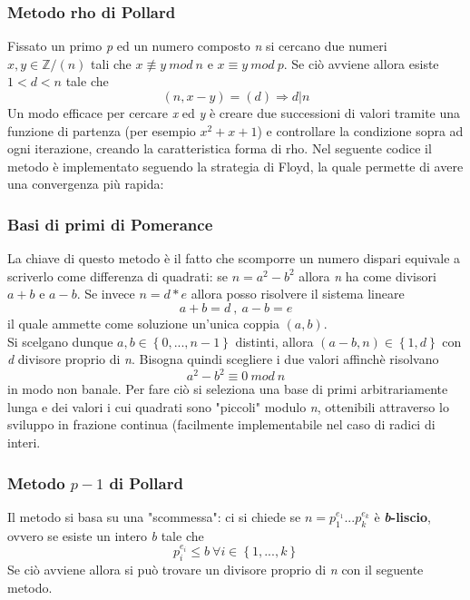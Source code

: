 \documentclass{article}
\begin{document}
	\subsubsection{Metodo rho di Pollard}
	Fissato un primo \textit{p} ed un numero composto \textit{n} si cercano due numeri \(x,y\in\mathbb{Z}/(n)\) tali che \(x\not\equiv y\ mod\ n\) e \(x\equiv y\ mod\ p\). Se ciò avviene allora esiste \(1<d<n\) tale che \[(n,x-y)=(d)\Rightarrow d|n\]
	Un modo efficace per cercare \textit{x} ed \textit{y} è creare due successioni di valori tramite una funzione di partenza (per esempio \(x^2+x+1\)) e controllare la condizione sopra ad ogni iterazione, creando la caratteristica forma di rho. Nel seguente codice il metodo è implementato seguendo la strategia di Floyd, la quale permette di avere una convergenza più rapida: 
	\vspace{1cm}
	
	\vspace{1cm}
	\subsubsection{Basi di primi di Pomerance}
	La chiave di questo metodo è il fatto che scomporre un numero dispari equivale a scriverlo come differenza di quadrati: se \(n=a^2-b^2\) allora \textit{n} ha come divisori \(a+b\) e \(a-b\). Se invece \(n=d*e\) allora posso risolvere il sistema lineare 
	\[a+b=d\ ,\ a-b=e\]
	il quale ammette come soluzione un'unica coppia \((a,b)\).\\ 
	Si scelgano dunque \(a,b\in\left\{0,...,n-1\right\}\) distinti, allora \((a-b,n)\in\left\{1,d\right\}\) con \textit{d} divisore proprio di \textit{n}.
	Bisogna quindi scegliere i due valori affinchè risolvano 
	\[a^2-b^2\equiv 0\ mod\ n \] in modo non banale.
	Per fare ciò si seleziona una base di primi arbitrariamente lunga e dei valori i cui quadrati sono "piccoli" modulo \textit{n}, ottenibili attraverso lo sviluppo in frazione continua (facilmente implementabile nel caso di radici di interi. 
	
	\vspace{1cm}
	
	\vspace{1cm}\vspace{1cm}
	
	\subsubsection{Metodo \(p-1\) di Pollard}
	Il metodo si basa su una "scommessa": ci si chiede se \(n=p_1^{e_1}...p_k^{e_k}\) è \textbf{\textit{b}-liscio}, ovvero se esiste un intero \textit{b} tale che \[p_i^{e_i}\le b\ \forall i\in\left\{1,...,k\right\}\]
	Se ciò avviene allora si può trovare un divisore proprio di \textit{n} con il seguente metodo.
	\vspace{1cm}
	
	\vspace{1cm}\vspace{1cm}
\end{document}
